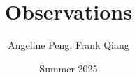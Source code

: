\documentclass[12pt, letterpaper]{article}
\title{Observations}
\author{Angeline Peng, Frank Qiang}
\date{Summer 2025}
\theoremstyle{definition}
\begin{document}
\maketitle

\begin{enumerate}

\end{enumerate}
\end{document}

